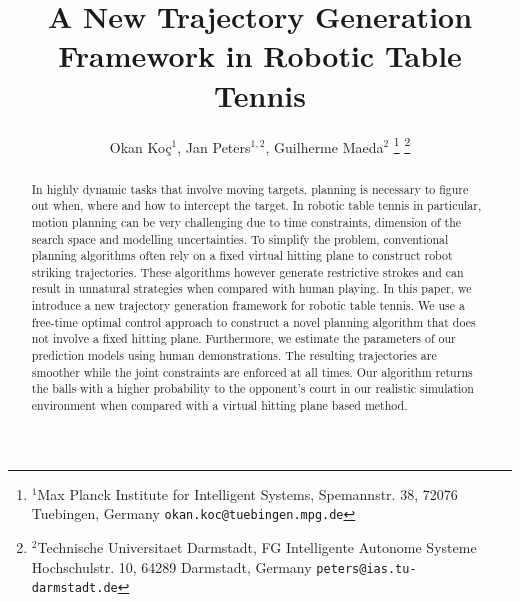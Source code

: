 \documentclass[letterpaper, 10 pt, conference]{ieeeconf}
\author{Okan Ko\c c$^{1}$, Jan Peters$^{1,2}$, Guilherme Maeda$^{2}$%
\thanks{$^{1}$Max Planck Institute for Intelligent Systems,
        Spemannstr. 38, 72076 Tuebingen, Germany
        {\tt\small okan.koc@tuebingen.mpg.de}}
\thanks{$^{2}$Technische Universitaet Darmstadt, FG Intelligente Autonome Systeme
        Hochschulstr. 10, 64289 Darmstadt, Germany {\tt\small peters@ias.tu-darmstadt.de}}
}
\title{A New Trajectory Generation Framework in Robotic Table Tennis}
\begin{document}
\maketitle
\thispagestyle{empty}
\pagestyle{empty}

\begin{abstract}

In highly dynamic tasks that involve moving targets, planning is necessary to figure out when, where and how to intercept the target. In robotic table tennis in particular, motion planning can be very challenging due to time constraints, dimension of the search space and modelling uncertainties. To simplify the problem, conventional planning algorithms often rely on a fixed virtual hitting plane to construct robot striking trajectories. These algorithms however generate restrictive strokes and can result in unnatural strategies when compared with human playing. In this paper, we introduce a new trajectory generation framework for robotic table tennis. We use a free-time optimal control approach to construct a novel planning algorithm that does not involve a fixed hitting plane. Furthermore, we estimate the parameters of our prediction models using human demonstrations. The resulting trajectories are smoother while the joint constraints are enforced at all times. Our algorithm returns the balls with a higher probability to the opponent's court in our realistic simulation environment when compared with a virtual hitting plane based method.



\end{abstract}










%
%



\end{document}
